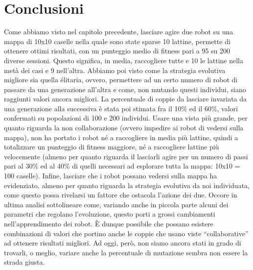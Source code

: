 \chapter{Conclusioni}
Come abbiamo visto nel capitolo precedente, lasciare agire due robot su una
mappa di 10x10 caselle nella quale sono state sparse 10 lattine, permette di
ottenere ottimi risultati, con un punteggio medio di fitness pari a 95 su 200
diverse sessioni. Questo significa, in media, raccogliere tutte e 10 le lattine
nella metà dei casi e 9 nell'altra.\newline
Abbiamo poi visto come la strategia evolutiva migliore sia quella élitaria,
ovvero, permettere ad un certo numero di robot di passare da una generazione
all'altra e come, non mutando questi individui, siano raggiunti valori ancora
migliori. La percentuale di coppie da lasciare invariata da una generazione alla
successiva è stata poi stimata fra il 10\% ed il 60\%, valori confermati su
popolazioni di 100 e 200 individui.\newline
Usare una vista più grande, per quanto riguarda la non collaborazione (ovvero
impedire ai robot di vedersi sulla mappa), non ha portato i robot né a
raccogliere in media più lattine, quindi a totalizzare un punteggio di fitness
maggiore, né a raccogliere lattine più velocemente (almeno per quanto riguarda
il lasciarli agire per un numero di passi pari al 30\% ed al 40\% di quelli
necessari ad esplorare tutta la mappa: 10x10 = 100 caselle).\newline
Infine, lasciare che i robot possano vedersi sulla mappa ha evidenziato, almeno
per quanto riguarda la strategia evolutiva da noi individuata, come questo possa
rivelarsi un fattore che ostacola l'azione dei due.\newline
Occore in ultima analisi sottolineare come, variando anche in piccola parte
alcuni dei parametri che regolano l'evoluzione, questo porti a grossi
cambiamenti nell'apprendimento dei robot. È dunque possibile che possano
esistere combinazioni di valori che portino anche le coppie che usano viste
``collaborative'' ad ottenere risultati migliori. Ad oggi, però, non siamo
ancora stati in grado di trovarli, o meglio, variare anche la percentuale di
mutazione sembra non essere la strada giusta.



